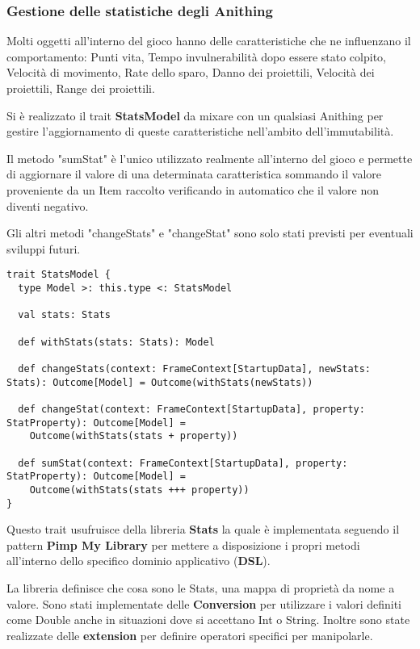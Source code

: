 \subsubsection{Gestione delle statistiche degli Anithing}
Molti oggetti all'interno del gioco hanno delle caratteristiche che ne influenzano il comportamento: 
Punti vita, Tempo invulnerabilità dopo essere stato colpito, Velocità di movimento, Rate dello sparo, Danno dei proiettili, Velocità dei proiettili, Range dei proiettili.

Si è realizzato il trait \textbf{StatsModel} da mixare con un qualsiasi Anithing 
per gestire l'aggiornamento di queste caratteristiche nell'ambito dell'immutabilità.

Il metodo "sumStat" è l'unico utilizzato realmente all'interno del gioco e permette di 
aggiornare il valore di una determinata caratteristica sommando il valore proveniente da un Item raccolto 
verificando in automatico che il valore non diventi negativo.

Gli altri metodi "changeStats" e "changeStat" sono solo stati previsti per eventuali sviluppi futuri.  

\begin{lstlisting}[basicstyle=\tiny]
trait StatsModel {
  type Model >: this.type <: StatsModel

  val stats: Stats

  def withStats(stats: Stats): Model

  def changeStats(context: FrameContext[StartupData], newStats: Stats): Outcome[Model] = Outcome(withStats(newStats))

  def changeStat(context: FrameContext[StartupData], property: StatProperty): Outcome[Model] =
    Outcome(withStats(stats + property))

  def sumStat(context: FrameContext[StartupData], property: StatProperty): Outcome[Model] =
    Outcome(withStats(stats +++ property))
}
\end{lstlisting}

Questo trait usufruisce della libreria \textbf{Stats} la quale è implementata seguendo il pattern \textbf{Pimp My Library} 
per mettere a disposizione i propri metodi all'interno dello specifico dominio applicativo (\textbf{DSL}).

La libreria definisce che cosa sono le Stats, una mappa di proprietà da nome a valore.
Sono stati implementate delle \textbf{Conversion} per utilizzare i valori definiti come Double anche in situazioni 
dove si accettano Int o String.
Inoltre sono state realizzate delle \textbf{extension} per definire operatori specifici per manipolarle.

